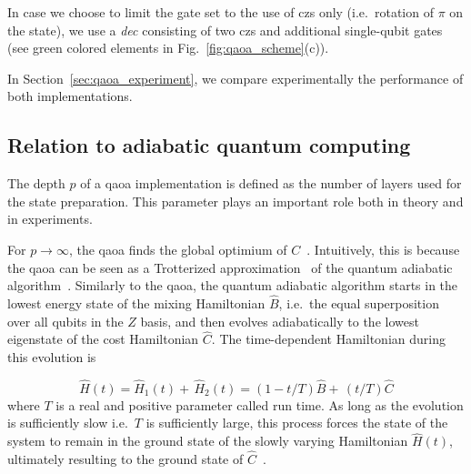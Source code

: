 In case we choose to limit the gate set to the use of \glspl{cz} only (i.e.\ rotation of $\pi$ on the \oo{} state), we use a \textit{\gls{dec} } consisting of two \glspl{cz} and additional single-qubit gates (see green colored elements in Fig.~\ref{fig:qaoa_scheme}(c)).

In Section~\ref{sec:qaoa_experiment}, we compare experimentally the performance of both implementations.

\subsection{Relation to adiabatic quantum computing}\label{sec:qaoa_relation_to_adiabiatic_computing}
The depth $p$ of a \gls{qaoa} implementation is defined as the number of layers used for the state preparation. This parameter plays an important role both in theory and in experiments.

For $p \rightarrow \infty$, the \gls{qaoa} finds the global optimium of $C$~\cite{Farhi2014AAlgorithm}. Intuitively, this is because the \gls{qaoa} can be seen as a Trotterized approximation~\cite{TrotterMathematics} of the quantum adiabatic algorithm~\cite{Farhi2000QuantumEvolution}. Similarly to the \gls{qaoa}, the quantum adiabatic algorithm starts in the lowest energy state of the mixing Hamiltonian $\hat B$, i.e.\ the equal superposition over all qubits in the $Z$ basis, and then evolves adiabatically to the lowest eigenstate of the cost Hamiltonian $\hat C$. The time-dependent Hamiltonian during this evolution is

\begin{equation} \label{eq:qaoa_adiabatic_evolution}
 \hat H(t)=\hat H_1(t) +\, \hat H_2(t) = (1-t / T) \hat B + \, (t / T) \hat C
 \end{equation}
where $T$ is a real and positive parameter called run time. As long as the evolution is sufficiently slow i.e.\ $T$ is sufficiently large, this process forces the state of the system to remain in the ground state of the slowly varying Hamiltonian $\hat H(t)$, ultimately resulting to the ground state of $\hat C$~\cite{Farhi2000QuantumEvolution, Farhi2014AAlgorithm}. 

